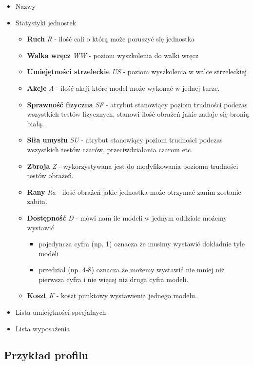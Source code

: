 \begin{itemize}
    \item Nazwy
    \item Statystyki jednostek
    \begin{itemize}
    	\item \textbf{Ruch} \textit{R} - ilość cali o którą może poruszyć się jednostka 
    	\item \textbf{Walka wręcz}  \textit{WW} - poziom wyszkolenia do walki wręcz
    	\item \textbf{Umiejętności strzeleckie}  \textit{US} - poziom wyszkolenia w walce strzeleckiej
    	\item \textbf{Akcje}  \textit{A} - ilość akcji które model może wykonać w jednej turze.
    	\item \textbf{Sprawność fizyczna}  \textit{SF} - atrybut stanowiący poziom trudności podczas wszystkich testów fizycznych, stanowi ilość obrażeń jakie zadaje się bronią białą. 
    	\item \textbf{Siła umysłu}  \textit{SU} - atrybut  stanowiący poziom trudności podczas wszystkich testów czarów, przeciwdziałania czarom etc.
    	\item \textbf{Zbroja}  \textit{Z} - wykorzystywana jest do modyfikowania poziomu trudności testów obrażeń. 
    	\item \textbf{Rany}  \textit{Ra} - ilość obrażeń jakie jednostka może otrzymać zanim zostanie zabita. 
    	\item \textbf{Dostępność}  \textit{D} - mówi nam ile modeli w jednym oddziale możemy wystawić
    	    \begin{itemize}
    	        \item pojedyncza cyfra (np. 1) oznacza że musimy wystawić dokładnie tyle modeli
    	        \item przedział (np. 4-8) oznacza że możemy wystawić nie mniej niż pierwsza cyfra i nie więcej niż druga cyfra modeli. 
    	    \end{itemize}
    	\item \textbf{Koszt}  \textit{K} - koszt punktowy wystawienia jednego modelu. 
    \end{itemize} 
    \item Lista umiejętności specjalnych
    \item Lista wyposażenia 
\end{itemize}

\subsection{Przykład profilu}
\hfill\\

